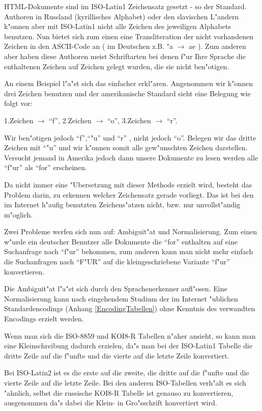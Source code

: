 HTML-Dokumente sind im ISO-Latin1 Zeichensatz gesetzt - so der Standard. Authoren in Russland (kyrillisches Alphabet) oder den slavischen L"andern k"onnen aber mit ISO-Latin1 nicht alle Zeichen des jeweiligen Alphabets benutzen. Nun bietet sich zum einen eine Transliteration der nicht vorhandenen Zeichen in den ASCII-Code an ( im Deutschen z.B. "a $\rightarrow$ ae ). Zum anderen aber haben diese Authoren meist Schriftarten bei denen f"ur Ihre Sprache die enthaltenen Zeichen auf Zeichen gelegt wurden, die sie nicht ben"otigen. 

An einem Beispiel l"a"st sich das einfacher erkl"aren. Angenommen wir k"onnen drei Zeichen benutzen und der amerikanische Standard sieht eine Belegung wie folgt vor:

1.Zeichen $\rightarrow$ "`f"', 2.Zeichen $\rightarrow$ "`o"', 3.Zeichen $\rightarrow$ "`r"'.

Wir ben"otigen jedoch "`f"',"`"u"' und "`r"' , nicht jedoch "`o"'. Belegen wir das dritte Zeichen mit "`"u"' und wir k"onnen somit alle gew"unschten Zeichen darstellen. Versucht jemand in Amerika jedoch dann unsere Dokumente zu lesen werden alle "`f"ur"' als "`for"' erscheinen. 

Da nicht immer eine "Ubersetzung mit dieser Methode erzielt wird, besteht das Problem darin, zu erkennen welcher Zeichensatz gerade vorliegt. Das ist bei den im Internet h"aufig benutzten Zeichens"atzen nicht, bzw. nur unvollst"andig m"oglich.

Zwei Probleme werfen sich nun auf: Ambiguit"at und Normalisierung. Zum einen w"urde ein deutscher Benutzer alle Dokumente die "`for"'  enthalten auf eine Suchanfrage nach "`f"ur"' bekommen, zum anderen kann man nicht mehr einfach die Suchanfragen nach "`F"UR"' auf die kleingeschriebene Variante "`f"ur"' konvertieren.

Die Ambiguit"at l"a"st sich durch den Sprachenerkenner aufl"osen. Eine Normalisierung kann nach eingehendem Studium der im Internet "ublichen Standardencodings (Anhang \ref{EncodingTabellen}) ohne Kenntnis des verwandten Encodings erzielt werden.

Wenn man sich die ISO-8859 und KOI8-R Tabellen n"aher ansieht, so kann man eine Kleinschreibung dadurch erzielen, da"s man bei der ISO-Latin1 Tabelle die dritte Zeile auf die f"unfte und die vierte auf die letzte Zeile konvertiert.

Bei ISO-Latin2 ist es die erste auf die zweite, die dritte auf die f"unfte und die vierte Zeile auf die letzte Zeile. Bei den anderen ISO-Tabellen verh"alt es sich "ahnlich, selbst die russische KOI8-R Tabelle ist genauso zu konvertieren, ausgenommen da"s dabei die Klein- in Gro"sschrift konvertiert wird.

